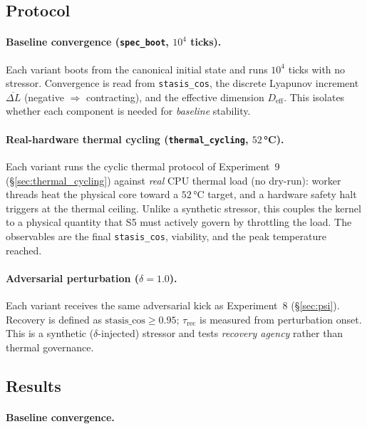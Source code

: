 \documentclass[11pt, a4paper]{article}
\begin{document}
\subsection{Protocol}

\paragraph{Baseline convergence (\texttt{spec\_boot}, $10^4$ ticks).}
Each variant boots from the canonical initial state and runs $10^4$ ticks with
no stressor. Convergence is read from \texttt{stasis\_cos}, the discrete
Lyapunov increment $\overline{\Delta L}$ (negative $\Rightarrow$ contracting),
and the effective dimension $D_\text{eff}$. This isolates whether each component
is needed for \emph{baseline} stability.

\paragraph{Real-hardware thermal cycling (\texttt{thermal\_cycling}, $52$\,°C).}
Each variant runs the cyclic thermal protocol of Experiment~9
(\S\ref{sec:thermal_cycling}) against \emph{real} CPU thermal load (no dry-run):
worker threads heat the physical core toward a $52$\,°C target, and a hardware
safety halt triggers at the thermal ceiling. Unlike a synthetic stressor, this
couples the kernel to a physical quantity that S5 must actively govern by
throttling the load. The observables are the final \texttt{stasis\_cos},
viability, and the peak temperature reached.

\paragraph{Adversarial perturbation ($\delta = 1.0$).}
Each variant receives the same adversarial kick as Experiment~8
(\S\ref{sec:psi}). Recovery is defined as $\text{stasis\_cos} \geq 0.95$;
$\tau_\text{rec}$ is measured from perturbation onset. This is a synthetic
($\delta$-injected) stressor and tests \emph{recovery agency} rather than
thermal governance.

\subsection{Results}

\paragraph{Baseline convergence.}
\end{document}
